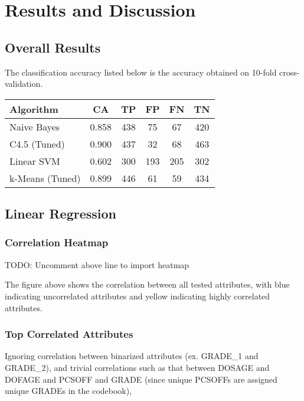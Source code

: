 \documentclass[]{article}
\begin{document}
\section{Results and Discussion}

\subsection{Overall Results}

The classification accuracy listed below is the accuracy obtained on 10-fold cross-validation.

\begin{tabular}{|l|c|c|c|c|c|}
\hline
Algorithm & CA & TP & FP & FN & TN \\
\hline
Naive Bayes & 0.858 & 438 & 75 & 67 & 420 \\ 
C4.5 (Tuned) & 0.900 & 437 & 32 & 68 & 463 \\
Linear SVM & 0.602 & 300 & 193 & 205 & 302 \\
k-Means (Tuned) & 0.899 & 446 & 61 & 59 & 434 \\
\hline
\end{tabular}

\subsection{Linear Regression}

\subsubsection{Correlation Heatmap}

TODO: Uncomment above line to import heatmap

The figure above shows the correlation between all tested attributes, 
with blue indicating uncorrelated attributes and yellow indicating highly correlated attributes.

\subsubsection{Top Correlated Attributes}
Ignoring correlation between binarized attributes (ex. GRADE\_1 and GRADE\_2), 
and trivial correlations such as that between DOSAGE and DOFAGE and PCSOFF and GRADE (since unique PCSOFFs are assigned unique GRADEs in the codebook),
\end{document}
